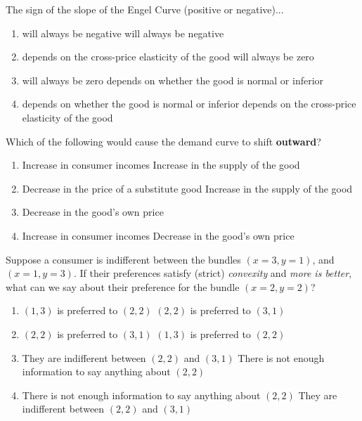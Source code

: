 \begin{question}[type=exam]{4}
  The sign of the slope of the Engel Curve (positive or negative)...
  \begin{enumerate}[label=\alph*), noitemsep]
    \item \vary
      {will always be negative}
      {will always be negative}
    \item \vary
      {depends on the cross-price elasticity of the good}
      {will always be zero}
    \item \vary
      {will always be zero}
      {depends on whether the good is normal or inferior} %
    \item \vary
      {depends on whether the good is normal or inferior} %
      {depends on the cross-price elasticity of the good}
  \end{enumerate}
\end{question}

\begin{question}[type=exam]{4}
  Which of the following would cause the demand curve to shift \textbf{outward}?
  \begin{enumerate}[label=\alph*), noitemsep]
    \item \vary
      {Increase in consumer incomes} %
      {Increase in the supply of the good}
    \item \vary
      {Decrease in the price of a substitute good}
      {Increase in the supply of the good}
    \item \vary
      {Decrease in the good's own price}
    \item \vary
      {Increase in consumer incomes} %
      {Decrease in the good's own price}
  \end{enumerate}
\end{question}

\begin{question}[type=exam]{4}
  Suppose a consumer is indifferent between the bundles $(x=3,y=1)$, and $(x=1,y=3)$.
  If their preferences satisfy (strict) \textit{convexity} and \textit{more is better}, 
  what can we say about their preference for the bundle $(x=2,y=2)$?
  \begin{enumerate}[label=\alph*), noitemsep]
    \item \vary
      {$(1,3)$ is preferred to $(2,2)$}
      {$(2,2)$ is preferred to $(3,1)$} %
    \item \vary
      {$(2,2)$ is preferred to $(3,1)$} %
      {$(1,3)$ is preferred to $(2,2)$}
    \item \vary
      {They are indifferent between $(2,2)$ and $(3,1)$}
      {There is not enough information to say anything about $(2,2)$}
    \item \vary
      {There is not enough information to say anything about $(2,2)$}
      {They are indifferent between $(2,2)$ and $(3,1)$}
  \end{enumerate}
\end{question}

